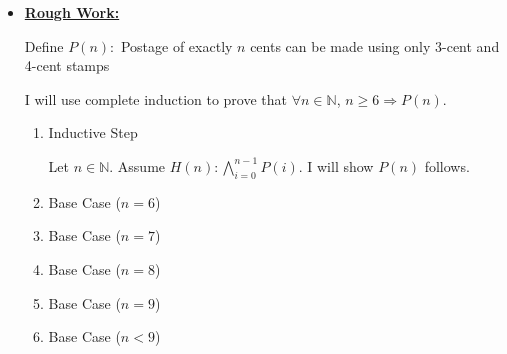 \documentclass[12pt]{article}
\begin{document}
\begin{itemize}
    \item

    \bigskip

    \begin{mdframed}
    \underline{\textbf{Rough Work:}}

    \bigskip

    Define $P(n):$ Postage of exactly $n$ cents can be made using only 3-cent
    and 4-cent stamps

    \bigskip

    I will use complete induction to prove that $\forall n \in \mathbb{N}$, $n \geq 6 \Rightarrow P(n)$.

    \bigskip

    \begin{enumerate}[1.]
        \item Inductive Step

        \begin{mdframed}
        Let $n \in \mathbb{N}$. Assume $H(n): \bigwedge\limits_{i=0}^{n-1} P(i)$. I will show
        $P(n)$ follows.
        \end{mdframed}

        \item Base Case ($n = 6$)
        \item Base Case ($n = 7$)
        \item Base Case ($n = 8$)
        \item Base Case ($n = 9$)
        \item Base Case ($n < 9$)
    \end{enumerate}
    \end{mdframed}
\end{itemize}
\end{document}
